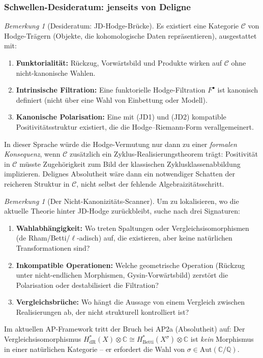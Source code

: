 \documentclass[aps,prd,twocolumn,superscriptaddress,nofootinbib]{revtex4-2}
\theoremstyle{definition}
\theoremstyle{remark}
\newtheorem{remark}[theorem]{Bemerkung}
\begin{document}
\subsubsection*{Schwellen-Desideratum: jenseits von Deligne}

\begin{remark}[Desideratum: JD-Hodge-Brücke]\label{ax:jd-hodge}
Es existiert eine Kategorie $\mathcal{C}$ von \glqq Hodge-Trägern\grqq{} (Objekte, die kohomologische Daten repräsentieren), ausgestattet mit:
\begin{enumerate}
\item[(JD1)] \textbf{Funktorialität:} Rückzug, Vorwärtsbild und Produkte wirken auf $\mathcal{C}$ ohne nicht-kanonische Wahlen.
\item[(JD2)] \textbf{Intrinsische Filtration:} Eine funktorielle Hodge-Filtration $F^\bullet$ ist kanonisch definiert (nicht über eine Wahl von Einbettung oder Modell).
\item[(JD3)] \textbf{Kanonische Polarisation:} Eine mit (JD1) und (JD2) kompatible Positivitätsstruktur existiert, die die Hodge--Riemann-Form verallgemeinert.
\end{enumerate}
In dieser Sprache würde die Hodge-Vermutung nur dann zu einer \emph{formalen Konsequenz}, wenn $\mathcal{C}$ zusätzlich ein Zyklus-Realisierungstheorem trägt: Positivität in $\mathcal{C}$ müsste Zugehörigkeit zum Bild der klassischen Zyklusklassenabbildung implizieren. Delignes Absolutheit wäre dann ein notwendiger Schatten der reicheren Struktur in $\mathcal{C}$, nicht selbst der fehlende Algebraizitätsschritt.
\end{remark}

\begin{remark}[Der Nicht-Kanonizitäts-Scanner]\label{rem:noncanonicity-scanner}
Um zu lokalisieren, wo die aktuelle Theorie hinter JD-Hodge zurückbleibt, suche nach drei Signaturen:
\begin{enumerate}
\item \textbf{Wahlabhängigkeit:} Wo treten Spaltungen oder Vergleichsisomorphismen (de Rham/Betti/$\ell$-adisch) auf, die \glqq existieren\grqq{}, aber keine natürlichen Transformationen sind?
\item \textbf{Inkompatible Operationen:} Welche geometrische Operation (Rückzug unter nicht-endlichen Morphismen, Gysin-Vorwärtsbild) zerstört die Polarisation oder destabilisiert die Filtration?
\item \textbf{Vergleichsbrüche:} Wo hängt die Aussage von einem Vergleich zwischen Realisierungen ab, der nicht strukturell kontrolliert ist?
\end{enumerate}
Im aktuellen AP-Framework tritt der Bruch bei AP2a (Absolutheit) auf: Der Vergleichsisomorphismus $H^*_{\mathrm{dR}}(X) \otimes \mathbb{C} \cong H^*_{\mathrm{Betti}}(X^\sigma) \otimes \mathbb{C}$ ist \emph{kein} Morphismus in einer natürlichen Kategorie -- er erfordert die Wahl von $\sigma \in \mathrm{Aut}(\mathbb{C}/\mathbb{Q})$.
\end{remark}
\end{document}
